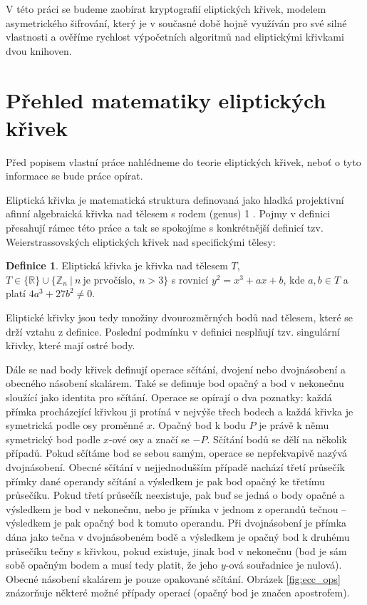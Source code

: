 \documentclass{article}
\theoremstyle{definition}
\newtheorem{definition}{Definice}[section]
\begin{document}
V této práci se budeme zaobírat kryptografií eliptických křivek, modelem asymetrického šifrování, který je v současné době hojně využíván pro své silné vlastnosti a ověříme rychlost výpočetních algoritmů nad eliptickými křivkami dvou knihoven.

\section{Přehled matematiky eliptických křivek}
Před popisem vlastní práce nahlédneme do teorie eliptických křivek, neboť o tyto informace se bude práce opírat.

Eliptická křivka je matematická struktura definovaná jako hladká projektivní afinní algebraická křivka nad tělesem s rodem (genus) 1 \cite{ecc_overview}. Pojmy v definici přesahují rámec této práce a tak se spokojíme s konkrétnější definicí tzv. Weierstrassovských eliptických křivek nad specifickými tělesy:

\begin{definition}
    \label{def:elliptic_curve}
    Eliptická křivka je křivka nad tělesem $T$, $T\in \{ \mathbb{R} \} \cup \{ \mathbb{Z}_n ~|~ n ~\text{je prvočíslo},~ n > 3 \}$ s rovnicí $y^2 = x^3 + ax + b$, kde $a,b\in T$ a platí $4a^3 + 27b^2 \neq 0$.
\end{definition}

Eliptické křivky jsou tedy množiny dvourozměrných bodů nad tělesem, které se drží vztahu z definice. Poslední podmínku v definici nesplňují tzv. singulární křivky, které mají ostré body. 

Dále se nad body křivek definují operace sčítání, dvojení nebo dvojnásobení a obecného násobení skalárem. Také se definuje bod opačný a bod v nekonečnu sloužící jako identita pro sčítání. Operace se opírají o dva poznatky: každá přímka procházející křivkou ji protíná v nejvýše třech bodech a každá křivka je symetrická podle osy proměnné $x$. Opačný bod k bodu $P$ je právě k němu symetrický bod podle $x$-ové osy a značí se $-P$. Sčítání bodů se dělí na několik případů. Pokud sčítáme bod se sebou samým, operace se nepřekvapivě nazývá dvojnásobení. Obecné sčítání v nejjednodušším případě nachází třetí průsečík přímky dané operandy sčítání a výsledkem je pak bod opačný ke třetímu průsečíku. Pokud třetí průsečík neexistuje, pak buď se jedná o body opačné a výsledkem je bod v nekonečnu, nebo je přímka v jednom z operandů tečnou -- výsledkem je pak opačný bod k tomuto operandu. Při dvojnásobení je přímka dána jako tečna v dvojnásobeném bodě a výsledkem je opačný bod k druhému průsečíku tečny s křivkou, pokud existuje, jinak bod v nekonečnu (bod je sám sobě opačným bodem a musí tedy platit, že jeho $y$-ová souřadnice je nulová). Obecné násobení skalárem je pouze opakované sčítání. Obrázek \ref{fig:ecc_ops} znázorňuje některé možné případy operací (opačný bod je značen apostrofem).
\end{document}
